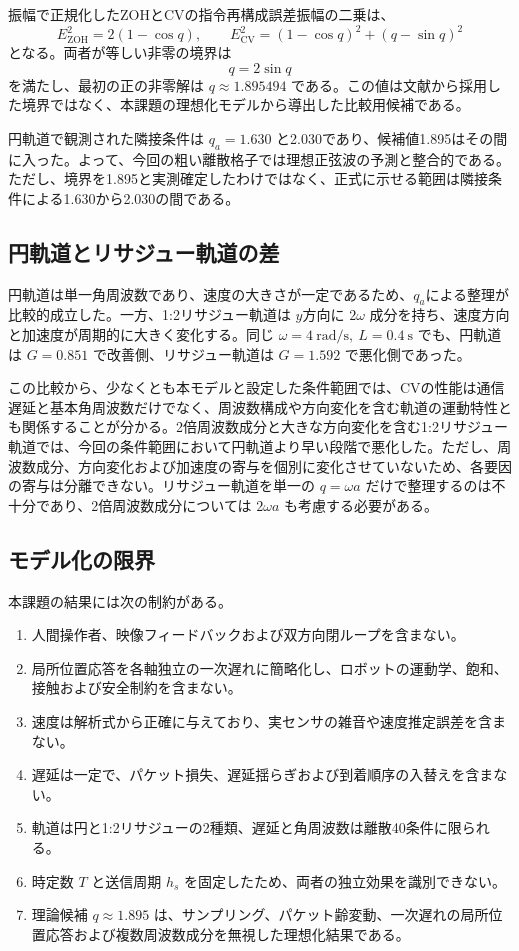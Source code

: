 \documentclass[11pt,a4paper]{article}
\begin{document}
振幅で正規化したZOHとCVの指令再構成誤差振幅の二乗は、
\begin{equation}
E_{\mathrm{ZOH}}^2=2(1-\cos q),
\qquad
E_{\mathrm{CV}}^2=(1-\cos q)^2+(q-\sin q)^2
\end{equation}
となる。両者が等しい非零の境界は
\begin{equation}
q=2\sin q
\end{equation}
を満たし、最初の正の非零解は $q\approx1.895494$ である。この値は文献から採用した境界ではなく、本課題の理想化モデルから導出した比較用候補である。

円軌道で観測された隣接条件は $q_a=1.630$ と2.030であり、候補値1.895はその間に入った。よって、今回の粗い離散格子では理想正弦波の予測と整合的である。ただし、境界を1.895と実測確定したわけではなく、正式に示せる範囲は隣接条件による1.630から2.030の間である。

\subsection{円軌道とリサジュー軌道の差}

円軌道は単一角周波数であり、速度の大きさが一定であるため、$q_a$による整理が比較的成立した。一方、1:2リサジュー軌道は $y$方向に $2\omega$ 成分を持ち、速度方向と加速度が周期的に大きく変化する。同じ $\omega=4\ \mathrm{rad/s},\ L=0.4\ \mathrm{s}$ でも、円軌道は $G=0.851$ で改善側、リサジュー軌道は $G=1.592$ で悪化側であった。

この比較から、少なくとも本モデルと設定した条件範囲では、CVの性能は通信遅延と基本角周波数だけでなく、周波数構成や方向変化を含む軌道の運動特性とも関係することが分かる。2倍周波数成分と大きな方向変化を含む1:2リサジュー軌道では、今回の条件範囲において円軌道より早い段階で悪化した。ただし、周波数成分、方向変化および加速度の寄与を個別に変化させていないため、各要因の寄与は分離できない。リサジュー軌道を単一の $q=\omega a$ だけで整理するのは不十分であり、2倍周波数成分については $2\omega a$ も考慮する必要がある。

\subsection{モデル化の限界}

本課題の結果には次の制約がある。
\begin{enumerate}[leftmargin=2.2em,itemsep=0.3em]
\item 人間操作者、映像フィードバックおよび双方向閉ループを含まない。
\item 局所位置応答を各軸独立の一次遅れに簡略化し、ロボットの運動学、飽和、接触および安全制約を含まない。
\item 速度は解析式から正確に与えており、実センサの雑音や速度推定誤差を含まない。
\item 遅延は一定で、パケット損失、遅延揺らぎおよび到着順序の入替えを含まない。
\item 軌道は円と1:2リサジューの2種類、遅延と角周波数は離散40条件に限られる。
\item 時定数 $T$ と送信周期 $h_s$ を固定したため、両者の独立効果を識別できない。
\item 理論候補 $q\approx1.895$ は、サンプリング、パケット齢変動、一次遅れの局所位置応答および複数周波数成分を無視した理想化結果である。
\end{enumerate}
\end{document}
